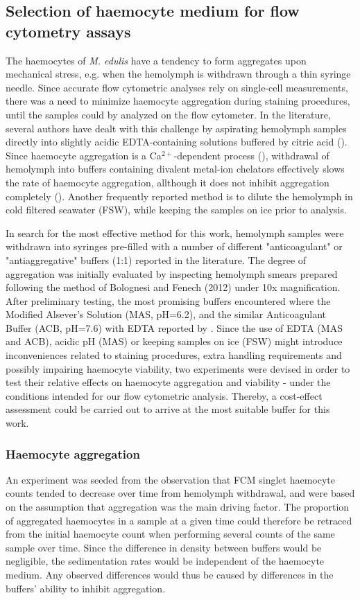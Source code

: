\subsection{Selection of haemocyte medium for flow cytometry assays}
The haemocytes of \emph{M. edulis} have a tendency to form aggregates upon mechanical stress, e.g. when the hemolymph is withdrawn through a thin syringe needle. Since accurate flow cytometric analyses rely on single-cell measurements, there was a need to minimize haemocyte aggregation during staining procedures, until the samples could by analyzed on the flow cytometer. In the literature, several authors have dealt with this challenge by aspirating hemolymph samples directly into slightly acidic EDTA-containing solutions buffered by citric acid (\cite{Söderhall1983, Bachere1988, LeFoll2010}). Since haemocyte aggregation is a Ca$^{2+}$-dependent process (\cite{Torreilles1999, Chen1995}), withdrawal of hemolymph into buffers containing divalent metal-ion chelators effectively slows the rate of haemocyte aggregation, allthough it does not inhibit aggregation completely (\cite{Chen1995}). Another frequently reported method is to dilute the hemolymph in cold filtered seawater (FSW), while keeping the samples on ice prior to analysis. 

In search for the most effective method for this work, hemolymph samples were withdrawn into syringes pre-filled with a number of different "anticoagulant" or "antiaggregative" buffers (1:1) reported in the literature. The degree of aggregation was initially evaluated by inspecting hemolymph smears prepared following the method of Bolognesi and Fenech (2012) under 10x magnification. After preliminary testing, the most promising buffers encountered where the Modified Alsever's Solution (MAS, pH=6.2), and the similar Anticoagulant Buffer (ACB, pH=7.6) with EDTA reported by \cite{Pipe1997}. Since the use of EDTA (MAS and ACB), acidic pH (MAS) or keeping samples on ice (FSW) might introduce inconveniences related to staining procedures, extra handling requirements and possibly impairing haemocyte viability, two experiments were devised in order to test their relative effects on haemocyte aggregation and viability - under the conditions intended for our flow cytometric analysis. Thereby, a cost-effect assessment could be carried out to arrive at the most suitable buffer for this work.

\subsubsection{Haemocyte aggregation}
An experiment was seeded from the observation that FCM singlet haemocyte counts tended to decrease over time from hemolymph withdrawal, and were based on the assumption that aggregation was the main driving factor. The proportion of aggregated haemocytes in a sample at a given time could therefore be retraced from the initial haemocyte count when performing several counts of the same sample over time. Since the difference in density between buffers would be negligible, the sedimentation rates would be independent of the haemocyte medium. Any observed differences would thus be caused by differences in the buffers' ability to inhibit aggregation.

